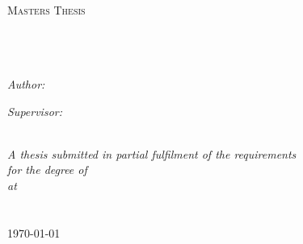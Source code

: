 \documentclass[11pt, a4paper, oneside]{Thesis}
\begin{document}
\begin{titlepage}
\begin{center}

\textsc{\LARGE \univname}\\[1.5cm] 
\textsc{\Large Masters Thesis}\\[0.5cm] 

\HRule \\[0.4cm] 

{\huge \bfseries \ttitle}\\[0.4cm] 

\HRule \\[1.5cm] 
 
\begin{minipage}{0.4\textwidth}
\begin{flushleft} \large
\emph{Author:}\\
{\authornames} 
\end{flushleft}
\end{minipage}
\begin{minipage}{0.4\textwidth}
\begin{flushright} \large
\emph{Supervisor:} \\
{\supname}   
\end{flushright}
\end{minipage}\\[3cm]
 
\large \textit{A thesis submitted in partial fulfilment of the requirements\\ for the degree of \degreename}\\[0.3cm] 
\textit{at}\\[0.4cm]

\univname\\\addressnames\\[2cm] 
 
{\large \today}\\[4cm] 

 
\vfill
\end{center}
\end{titlepage}


\end{document}
